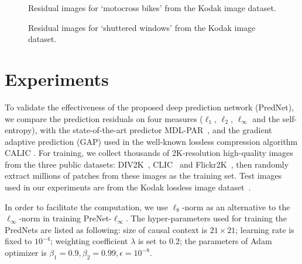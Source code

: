 \documentclass{article}
\def\w{4cm}
\def\h{3cm}
\begin{document}
\begin{figure*}[!h]
\centering
{}
\caption{Residual images for `motocross bikes' from the Kodak image dataset.}
\label{fig:bikes}
\end{figure*}
\begin{figure*}[!h]
\centering
{}
\caption{Residual images for `shuttered windows' from the Kodak image dataset.}
\label{fig:windows}
\end{figure*}

\section{Experiments}
To validate the effectiveness of the proposed deep prediction network (PredNet), we compare the prediction residuals on four measures ($\ell_1$, $\ell_2$, $\ell_\infty$ and the self-entropy), with the state-of-the-art predictor MDL-PAR~\cite{MDL-PAR}, and the gradient adaptive prediction (GAP) used in the well-known lossless compression algorithm CALIC \cite{CALIC}.
For training, we collect thousands of 2K-resolution high-quality images from the three public datasets: DIV2K~\cite{DIV2K}, CLIC~\cite{CLIC} and Flickr2K~\cite{Flickr2K}, then randomly extract millions of patches from these images as the training set.
Test images used in our experiments are from the Kodak lossless image dataset~\cite{kodak}.

In order to facilitate the computation, we use $\ell_8$-norm as an alternative to the $\ell_\infty$-norm in training PreNet-$\ell_\infty$.
The hyper-parameters used for training the PredNets are listed as following: size of causal context is $21 \times 21$; learning rate is fixed to $10^{-4}$; weighting coefficient $\lambda$ is set to $0.2$; the parameters of Adam optimizer is $\beta_1=0.9, \beta_2=0.99, \epsilon=10^{-8}$.
\end{document}
